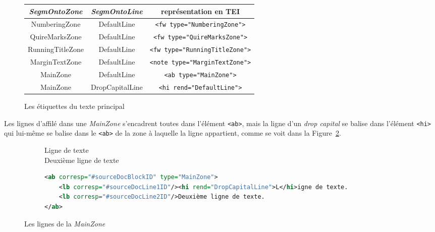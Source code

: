 \documentclass[class=article, crop=false]{standalone}
\begin{document}
\begin{figure}[ht]
\centering
\begin{tabular}{| c | c | c |}
\hline
\textit{SegmOntoZone} & \textit{SegmOntoLine} & représentation en \acrshort{TEI}\\
\hline \hline
NumberingZone & DefaultLine & \texttt{<fw type="NumberingZone">} \\ \hline
QuireMarksZone & DefaultLine & \texttt{<fw type="QuireMarksZone">} \\ \hline
RunningTitleZone & DefaultLine & \texttt{<fw type="RunningTitleZone">} \\ \hline
MarginTextZone & DefaultLine & \texttt{<note type="MarginTextZone">} \\ \hline
MainZone & DefaultLine & \texttt{<ab type="MainZone">} \\ \hline
MainZone & DropCapitalLine & \texttt{<hi rend="DefaultLine">} \\ \hline
\end{tabular}
\caption{Les étiquettes du texte principal}
\label{tab:tags}
\end{figure}

\noindent Les lignes d'affilé dans une \textit{MainZone} s'encadrent toutes dans l'élément \texttt{<ab>}, mais la ligne d'un \textit{drop capital} se balise dans l'élément \texttt{<hi>} qui lui-même se balise dans le \texttt{<ab>} de la zone à laquelle la ligne appartient, comme se voit dans la Figure~\ref{fig:mainzone}.

\begin{figure}[ht]
\centering
\begin{subfigure}[b]{0.4\textwidth}
\Huge L\normalsize igne de texte \\
Deuxième ligne de texte
\end{subfigure}

\hspace{1cm}%

\begin{subfigure}[b]{\textwidth}
\begin{lstlisting}[language=XML]
<ab corresp="#sourceDocBlockID" type="MainZone">
	<lb corresp="#sourceDocLine1ID"/><hi rend="DropCapitalLine">L</hi>igne de texte.
	<lb corresp="#sourceDocLine2ID"/>Deuxième ligne de texte.
</ab>
\end{lstlisting}
\end{subfigure}

\hspace{1cm}%

\caption{Les lignes de la \textit{MainZone}}
\label{fig:mainzone}
\end{figure}
\end{document}

